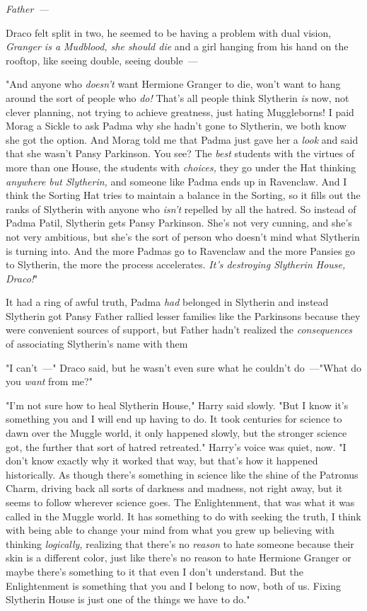\emph{Father~--- }

Draco felt split in two, he seemed to be having a problem with dual vision,
\emph{Granger is a Mudblood, she should die} and a girl hanging from his hand
on the rooftop, like seeing double, seeing double~---

"And anyone who \emph{doesn't} want Hermione Granger to die, won't want to hang
around the sort of people who \emph{do!} That's all people think Slytherin
\emph{is} now, not clever planning, not trying to achieve greatness, just
hating Muggleborns! I paid Morag a Sickle to ask Padma why she hadn't gone to
Slytherin, we both know she got the option. And Morag told me that Padma just
gave her a \emph{look} and said that she wasn't Pansy Parkinson. You see? The
\emph{best} students with the virtues of more than one House, the students with
\emph{choices,} they go under the Hat thinking \emph{anywhere but Slytherin,}
and someone like Padma ends up in Ravenclaw. And{\el} I think the Sorting
Hat tries to maintain a balance in the Sorting, so it fills out the ranks of
Slytherin with anyone who \emph{isn't} repelled by all the hatred. So instead
of Padma Patil, Slytherin gets Pansy Parkinson. She's not very cunning, and
she's not very ambitious, but she's the sort of person who doesn't mind what
Slytherin is turning into. And the more Padmas go to Ravenclaw and the more
Pansies go to Slytherin, the more the process accelerates. \emph{It's
destroying Slytherin House, Draco!}"

It had a ring of awful truth, Padma \emph{had} belonged in Slytherin{\el}
and instead Slytherin got Pansy{\el} Father rallied lesser families like the
Parkinsons because they were convenient sources of support, but Father hadn't
realized the \emph{consequences} of associating Slytherin's name with
them{\el}

"I can't~---" Draco said, but he wasn't even sure what he couldn't do~---"What do
you \emph{want} from me?"

"I'm not sure how to heal Slytherin House," Harry said slowly. "But I know it's
something you and I will end up having to do. It took centuries for science to
dawn over the Muggle world, it only happened slowly, but the stronger science
got, the further that sort of hatred retreated." Harry's voice was quiet, now.
"I don't know exactly why it worked that way, but that's how it happened
historically. As though there's something in science like the shine of the
Patronus Charm, driving back all sorts of darkness and madness, not right away,
but it seems to follow wherever science goes. The Enlightenment, that was what
it was called in the Muggle world. It has something to do with seeking the
truth, I think{\el} with being able to change your mind from what you grew
up believing{\el} with thinking \emph{logically,} realizing that there's no
\emph{reason} to hate someone because their skin is a different color, just
like there's no reason to hate Hermione Granger{\el} or maybe there's
something to it that even I don't understand. But the Enlightenment is
something that you and I belong to now, both of us. Fixing Slytherin House is
just one of the things we have to do."

